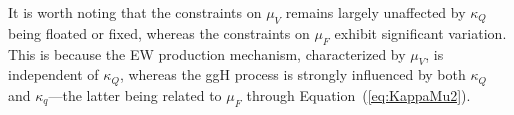 
It is worth noting that the constraints on $\mu_V$ remains largely unaffected by $\kappa_Q$ being floated or fixed, whereas the constraints on $\mu_F$ exhibit significant variation. This is because the EW production mechanism, characterized by $\mu_V$, is independent of $\kappa_Q$, whereas the ggH process is strongly influenced by both $\kappa_Q$ and $\kappa_q$---the latter being related to $\mu_F$ through Equation~(\ref{eq:KappaMu2}).







